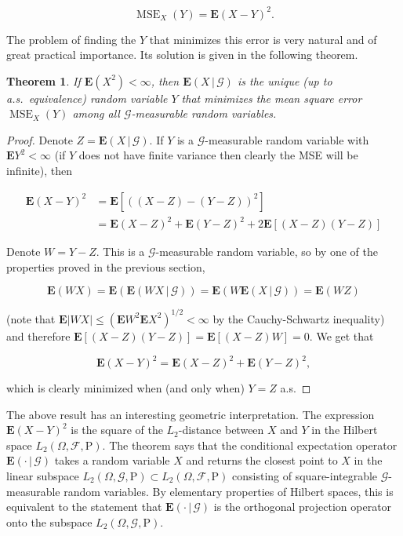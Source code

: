 \documentclass[11pt]{report}
\theoremstyle{plain}
\newtheorem{thm}{Theorem}[chapter]
\theoremstyle{definition}
\begin{document}
\[
\operatorname{MSE}_X(Y) = \mathbf{E}(X-Y)^2.
\]

The problem of finding the $Y$ that minimizes this error is very natural and of great practical importance. Its solution is given in the following theorem.

\begin{thm}
If $\mathbf{E}(X^2)<\infty$, then $\mathbf{E}\left(X\,|\,\mathcal{G}\right)$ is the unique (up to a.s.\ equivalence) random variable $Y$ that minimizes the mean square error $\operatorname{MSE}_X(Y)$ among all $\mathcal{G}$-measurable random variables.
\end{thm}

\begin{proof}
Denote $Z=\mathbf{E}\left(X\,|\,\mathcal{G}\right)$. If $Y$ is a $\mathcal{G}$-measurable random variable with $\mathbf{E} Y^2<\infty$ (if $Y$ does not have finite variance then clearly the MSE will be infinite), then

\begin{align*}
\mathbf{E}(X-Y)^2 &= \mathbf{E}[((X-Z)-(Y-Z))^2] \\
&= \mathbf{E}(X-Z)^2 + \mathbf{E}(Y-Z)^2
+ 2 \mathbf{E}[(X-Z)(Y-Z)]
\end{align*}

Denote $W=Y-Z$. This is a $\mathcal{G}$-measurable random variable, so by one of the properties proved in the previous section,

\[
\mathbf{E}(WX) = \mathbf{E}(\mathbf{E}\left(WX\,|\,\mathcal{G}\right))
= \mathbf{E}(W \mathbf{E}\left(X\,|\,\mathcal{G}\right)) = \mathbf{E}(WZ)
\]

(note that $\mathbf{E}|WX|\le (\mathbf{E} W^2 \mathbf{E} X^2)^{1/2}<\infty$ by the Cauchy-Schwartz inequality) and therefore $\mathbf{E}[(X-Z)(Y-Z)] = \mathbf{E}[(X-Z)W]=0$. We get that

\[
\mathbf{E}(X-Y)^2 = \mathbf{E}(X-Z)^2 + \mathbf{E}(Y-Z)^2,
\]

which is clearly minimized when (and only when) $Y=Z$ a.s.
\end{proof}

The above result has an interesting geometric interpretation. The expression $\mathbf{E}(X-Y)^2$ is the square of the $L_2$-distance between $X$ and $Y$ in the Hilbert space $L_2(\Omega, \mathcal{F},\mathrm{P})$. The theorem says that the conditional expectation operator $\mathbf{E}\left(\cdot\,|\,\mathcal{G}\right)$ takes a random variable $X$ and returns the closest point to $X$ in the linear subspace $L_2(\Omega, \mathcal{G},\mathrm{P})\subset L_2(\Omega, \mathcal{F},\mathrm{P})$ consisting of square-integrable $\mathcal{G}$-measurable random variables. By elementary properties of Hilbert spaces, this is equivalent to the statement that $\mathbf{E}\left(\cdot\,|\,\mathcal{G}\right)$ is the orthogonal projection operator onto the subspace $L_2(\Omega, \mathcal{G},\mathrm{P})$.
\end{document}
